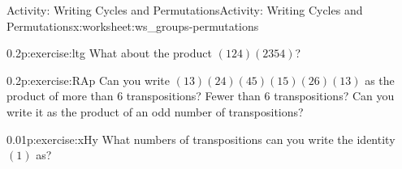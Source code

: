 \documentclass[11pt]{book}
\begin{document}
\begin{worksheet-subsection}{Activity: Writing Cycles and Permutations}{}{Activity: Writing Cycles and Permutations}{}{}{x:worksheet:ws_groups-permutations}
\begin{divisionexercise}{5}{}{0.2}{p:exercise:ltg}
What about the product \((124)(2354)\)?%
\end{divisionexercise}%
\begin{divisionexercise}{6}{}{0.2}{p:exercise:RAp}%
Can you write \((13)(24)(45)(15)(26)(13)\) as the product of more than 6 transpositions?  Fewer than 6 transpositions?  Can you write it as the product of an odd number of transpositions?%
\end{divisionexercise}%
\begin{divisionexercise}{7}{}{0.01}{p:exercise:xHy}%
What numbers of transpositions can you write the identity \((1)\) as?%
\end{divisionexercise}%
\end{worksheet-subsection}
\restoregeometry
\end{document}

